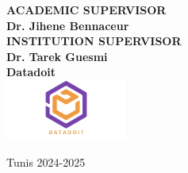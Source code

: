 \begin{titlepage}
{\fontsize{12pt}{14pt}\selectfont\textbf{ACADEMIC SUPERVISOR}}\\
{\fontsize{12pt}{14pt}\selectfont\textbf{Dr. Jihene Bennaceur}}\\[1.5cm]

{\fontsize{12pt}{14pt}\selectfont\textbf{INSTITUTION SUPERVISOR}}\\
{\fontsize{12pt}{14pt}\selectfont\textbf{Dr. Tarek Guesmi}}\\[1.5cm]

{\fontsize{12pt}{14pt}\selectfont\textbf{Datadoit}}\\[0.5cm]
\includegraphics[width=0.3\textwidth]{Images/Datadoitlogo (2).png}

\vfill
{\fontsize{12pt}{14pt}\selectfont Tunis 2024-2025}

\end{titlepage}
